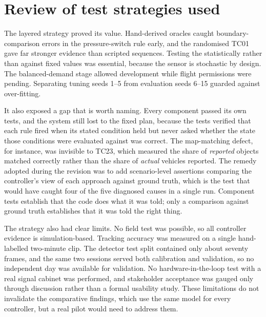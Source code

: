 \section{Review of test strategies used}\label{sec:eval-review}

The layered strategy proved its value. Hand-derived oracles caught boundary-comparison errors in the pressure-switch rule early, and the randomised TC01 gave far stronger evidence than scripted sequences. Testing the \vls{} statistically rather than against fixed values was essential, because the sensor is stochastic by design. The balanced-demand stage allowed development while flight permissions were pending. Separating tuning seeds 1--5 from evaluation seeds 6--15 guarded against over-fitting.

It also exposed a gap that is worth naming. Every component passed its own tests, and the system still lost
to the fixed plan, because the tests verified that each rule fired when its stated condition held but never
asked whether the state those conditions were evaluated against was correct. The map-matching defect, for
instance, was invisible to TC23, which measured the share of \emph{reported} objects matched correctly rather
than the share of \emph{actual} vehicles reported. The remedy adopted during the revision was to add
scenario-level assertions comparing the controller's view of each approach against \sumo{} ground truth,
which is the test that would have caught four of the five diagnosed causes in a single run. Component tests
establish that the code does what it was told; only a comparison against ground truth establishes that it was
told the right thing.

The strategy also had clear limits. No field test was possible, so all controller evidence is simulation-based. Tracking accuracy was measured on a single hand-labelled two-minute clip. The detector test split contained only about seventy frames, and the same two sessions served both calibration and validation, so no independent day was available for validation. No hardware-in-the-loop test with a real signal cabinet was performed, and stakeholder acceptance was gauged only through discussion rather than a formal usability study. These limitations do not invalidate the comparative findings, which use the same model for every controller, but a real pilot would need to address them.

